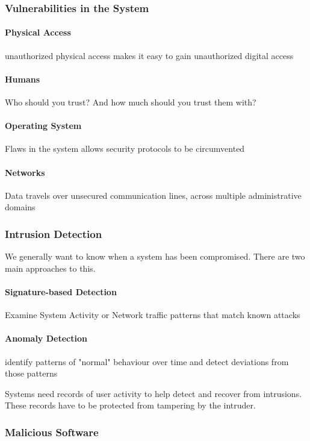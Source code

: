 \documentclass{article}
\begin{document}
\subsubsection{Vulnerabilities in the System}

\paragraph{Physical Access} unauthorized physical access makes it easy to gain unauthorized digital access
\paragraph{Humans} Who should you trust? And how much should you trust them with?
\paragraph{Operating System} Flaws in the system allows security protocols to be circumvented
\paragraph{Networks} Data travels over unsecured communication lines, across multiple administrative domains

\subsubsection{Intrusion Detection}

We generally want to know when a system has been compromised. There are two main approaches to this.

\paragraph{Signature-based Detection} Examine System Activity or Network traffic patterns that match known attacks
\paragraph{Anomaly Detection} identify patterns of "normal" behaviour over time and detect deviations from those patterns

Systems need records of user activity to help detect and recover from intrusions. These records have to be protected from tampering by the intruder.

\subsubsection{Malicious Software}
\end{document}
